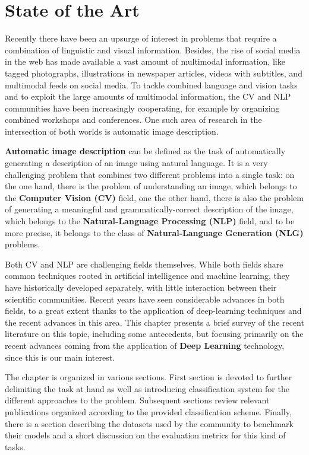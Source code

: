 \chapter{State of the Art}
\label{chapter:state_of_the_art}

Recently there have been an upsurge of interest in problems that require a combination of linguistic and visual information. Besides, the rise of social media in the web has made available a vast amount of multimodal information, like tagged photographs, illustrations in newspaper articles, videos with subtitles, and multimodal feeds on social media. To tackle combined language and vision tasks and to exploit the large amounts of multimodal information, the CV and NLP communities have been increasingly cooperating, for example by organizing combined workshops and conferences. One such area of research in the intersection of both worlds is automatic image description.

\textbf{Automatic image description} can be defined as the task of automatically generating a description of an image using natural language. It is a very challenging problem that combines two different problems into a single task: on the one hand, there is the problem of understanding an image, which belongs to the \textbf{Computer Vision (CV)} field, one the other hand, there is also the problem of generating a meaningful and grammatically-correct description of the image, which belongs to the \textbf{Natural-Language Processing (NLP)} field, and to be more precise, it belongs to the class of \textbf{Natural-Language Generation (NLG)} problems.

Both CV and NLP are challenging fields themselves. While both fields share common techniques rooted in artificial intelligence and machine learning, they have historically developed separately, with little interaction between their scientific communities.  Recent years have seen considerable advances in both fields, to a great extent thanks to the application of deep-learning techniques and the recent advances in this area. This chapter presents a brief survey of the recent literature on this topic, including some antecedents, but focusing primarily on the recent advances coming from the application of \textbf{Deep Learning} technology, since this is our main interest.

The chapter is organized in various sections. First section is devoted to further delimiting the task at hand as well as introducing classification system for the different approaches to the problem. Subsequent sections review relevant publications organized according to the provided classification scheme. Finally, there is a section describing the datasets used by the community to benchmark their models and a short discussion on the evaluation metrics for this kind of tasks.

